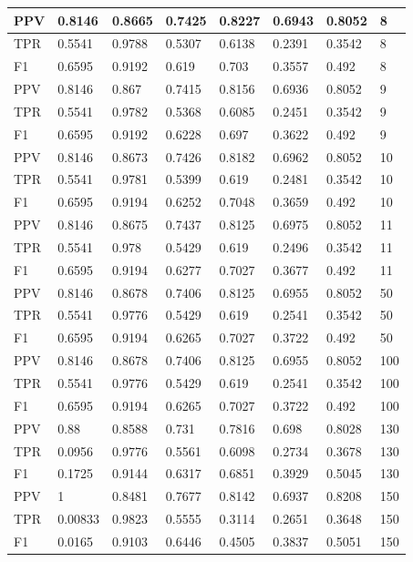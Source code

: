 \documentclass{classrep}
\begin{document}
\begin{table}[H]
\begin{adjustbox}{max width=\textwidth}
\begin{tabular}{|l|l|l|l|l|l|l|l|}
        PPV & 0.8146 & 0.8665 & 0.7425 & 0.8227 & 0.6943 & 0.8052 & 8 \\ \hline
        TPR & 0.5541 & 0.9788 & 0.5307 & 0.6138 & 0.2391 & 0.3542 & 8 \\ \hline
        F1 & 0.6595 & 0.9192 & 0.619 & 0.703 & 0.3557 & 0.492 & 8 \\ \hline
        PPV & 0.8146 & 0.867 & 0.7415 & 0.8156 & 0.6936 & 0.8052 & 9 \\ \hline
        TPR & 0.5541 & 0.9782 & 0.5368 & 0.6085 & 0.2451 & 0.3542 & 9 \\ \hline
        F1 & 0.6595 & 0.9192 & 0.6228 & 0.697 & 0.3622 & 0.492 & 9 \\ \hline
        PPV & 0.8146 & 0.8673 & 0.7426 & 0.8182 & 0.6962 & 0.8052 & 10 \\ \hline
        TPR & 0.5541 & 0.9781 & 0.5399 & 0.619 & 0.2481 & 0.3542 & 10 \\ \hline
        F1 & 0.6595 & 0.9194 & 0.6252 & 0.7048 & 0.3659 & 0.492 & 10 \\ \hline
        PPV & 0.8146 & 0.8675 & 0.7437 & 0.8125 & 0.6975 & 0.8052 & 11 \\ \hline
        TPR & 0.5541 & 0.978 & 0.5429 & 0.619 & 0.2496 & 0.3542 & 11 \\ \hline
        F1 & 0.6595 & 0.9194 & 0.6277 & 0.7027 & 0.3677 & 0.492 & 11 \\ \hline
        PPV & 0.8146 & 0.8678 & 0.7406 & 0.8125 & 0.6955 & 0.8052 & 50 \\ \hline
        TPR & 0.5541 & 0.9776 & 0.5429 & 0.619 & 0.2541 & 0.3542 & 50 \\ \hline
        F1 & 0.6595 & 0.9194 & 0.6265 & 0.7027 & 0.3722 & 0.492 & 50 \\ \hline
        PPV & 0.8146 & 0.8678 & 0.7406 & 0.8125 & 0.6955 & 0.8052 & 100 \\ \hline
        TPR & 0.5541 & 0.9776 & 0.5429 & 0.619 & 0.2541 & 0.3542 & 100 \\ \hline
        F1 & 0.6595 & 0.9194 & 0.6265 & 0.7027 & 0.3722 & 0.492 & 100 \\ \hline
        PPV & 0.88 & 0.8588 & 0.731 & 0.7816 & 0.698 & 0.8028 & 130 \\ \hline
        TPR & 0.0956 & 0.9776 & 0.5561 & 0.6098 & 0.2734 & 0.3678 & 130 \\ \hline
        F1 & 0.1725 & 0.9144 & 0.6317 & 0.6851 & 0.3929 & 0.5045 & 130 \\ \hline
        PPV & 1 & 0.8481 & 0.7677 & 0.8142 & 0.6937 & 0.8208 & 150 \\ \hline
        TPR & 0.00833 & 0.9823 & 0.5555 & 0.3114 & 0.2651 & 0.3648 & 150 \\ \hline
        F1 & 0.0165 & 0.9103 & 0.6446 & 0.4505 & 0.3837 & 0.5051 & 150 \\ \hline
    \end{tabular}
\end{adjustbox}
\end{table}
\end{document}
